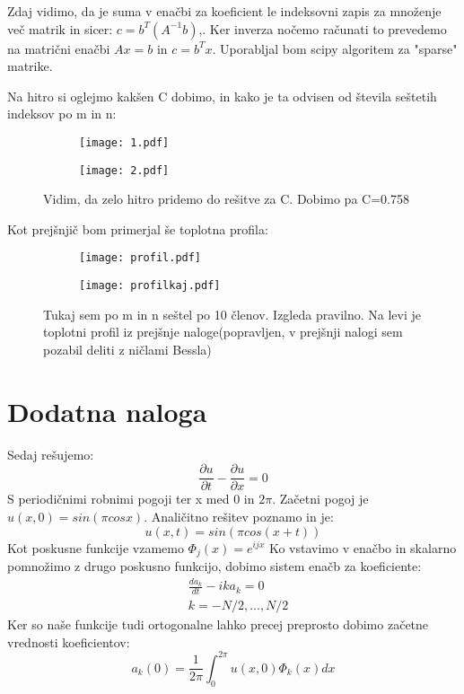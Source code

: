\documentclass{article}
\begin{document}
Zdaj vidimo, da je suma v enačbi za koeficient le indeksovni zapis za množenje več matrik in sicer: $c = b ^T(A^{-1} b)$,.
Ker inverza nočemo računati to prevedemo na matrični enačbi $Ax = b$ in $c = b^T x$. Uporabljal bom scipy algoritem za "sparse" matrike.
 
Na hitro si oglejmo kakšen C dobimo, in kako je ta odvisen od števila seštetih indeksov po m in n:

\begin{figure}[H]
\begin{subfigure}{.5\textwidth}
\texttt{[image: 1.pdf]}
\end{subfigure}
\begin{subfigure}{.5\textwidth}
\texttt{[image: 2.pdf]}
\end{subfigure}
\caption*{Vidim, da zelo hitro pridemo do rešitve za C. Dobimo pa C=0.758}
\end{figure}
\newpage
Kot prejšnjič bom primerjal še toplotna profila:


\begin{figure}[H]
\begin{subfigure}{.5\textwidth}
\texttt{[image: profil.pdf]}
\end{subfigure}
\begin{subfigure}{.5\textwidth}
\texttt{[image: profilkaj.pdf]}
\end{subfigure}
\caption*{Tukaj sem po m in n seštel po 10 členov. Izgleda pravilno. Na levi je toplotni profil iz prejšnje naloge(popravljen, v prejšnji nalogi sem pozabil deliti z ničlami Bessla)}
\end{figure}

\newpage
\section{Dodatna naloga}

Sedaj rešujemo:
\begin{equation*}
\frac{\partial u}{\partial t} - \frac{\partial u}{\partial x} = 0
\end{equation*}
S periodičnimi robnimi pogoji ter x med 0 in $2\pi$.
Začetni pogoj je $u(x,0) = sin(\pi cosx )$.
Analičitno rešitev poznamo in je:
\begin{equation*}
u(x,t) = sin(\pi cos(x+t))
\end{equation*}
Kot poskusne funkcije vzamemo $\Phi_j(x) = e^{ijx}$
Ko vstavimo v enačbo in skalarno pomnožimo z drugo poskusno funkcijo, dobimo sistem enačb za koeficiente:
\begin{align*}
&\frac{d a_k}{dt} - i k a_k = 0 \\
& k= -N/2, ...,N/2
\end{align*}
Ker so naše funkcije tudi ortogonalne lahko precej preprosto dobimo začetne vrednosti koeficientov:
\begin{equation*}
a_k(0) =\frac{1}{2\pi}\int_0^{2\pi} u(x,0) \Phi_k(x) dx
\end{equation*}
\end{document}

